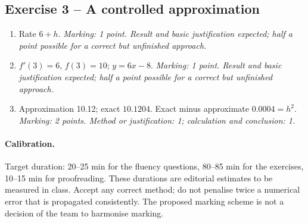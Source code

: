 \subsection*{Exercise 3 -- A controlled approximation}
\begin{enumerate}
\item Rate $6+h$. \textit{Marking: 1 point. Result and basic justification expected; half a point possible for a correct but unfinished approach.}
\item $f\prime(3)=6$, $f(3)=10$; $y=6x-8$. \textit{Marking: 1 point. Result and basic justification expected; half a point possible for a correct but unfinished approach.}
\item Approximation 10.12; exact $10.1204$. Exact minus approximate $0.0004=h^2$. \textit{Marking: 2 points. Method or justification: 1; calculation and conclusion: 1.}
\end{enumerate}
\paragraph{Calibration.} Target duration: 20--25 min for the fluency questions, 80--85 min for the exercises, 10--15 min for proofreading. These durations are editorial estimates to be measured in class. Accept any correct method; do not penalise twice a numerical error that is propagated consistently. The proposed marking scheme is not a decision of the team to harmonise marking.
